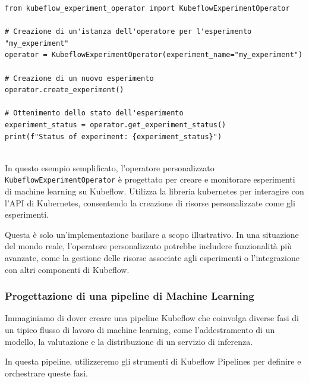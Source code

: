 \begin{code}
\label{code:apx:a:python}
\begin{verbatim}
from kubeflow_experiment_operator import KubeflowExperimentOperator

# Creazione di un'istanza dell'operatore per l'esperimento "my_experiment"
operator = KubeflowExperimentOperator(experiment_name="my_experiment")

# Creazione di un nuovo esperimento
operator.create_experiment()

# Ottenimento dello stato dell'esperimento
experiment_status = operator.get_experiment_status()
print(f"Status of experiment: {experiment_status}")


\end{verbatim}
\end{code}

In questo esempio semplificato, l'operatore personalizzato {\small \verb|KubeflowExperimentOperator|} è progettato per creare e monitorare esperimenti di machine learning su Kubeflow. Utilizza la libreria kubernetes per interagire con l'API di Kubernetes, consentendo la creazione di risorse personalizzate come gli esperimenti.

Questa è solo un'implementazione basilare a scopo illustrativo. In una situazione del mondo reale, l'operatore personalizzato potrebbe includere funzionalità più avanzate, come la gestione delle risorse associate agli esperimenti o l'integrazione con altri componenti di Kubeflow.

\subsubsection{Progettazione di una pipeline di Machine Learning}

Immaginiamo di dover creare una pipeline Kubeflow che coinvolga diverse fasi di un tipico flusso di lavoro di machine learning, come l'addestramento di un modello, la valutazione e la distribuzione di un servizio di inferenza. 

In questa pipeline, utilizzeremo gli strumenti di Kubeflow Pipelines per definire e orchestrare queste fasi.

